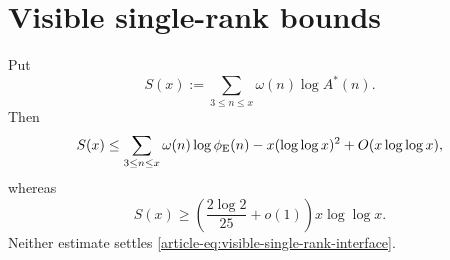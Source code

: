 \section{Visible single-rank bounds}
\label{sec:supp-visible-rank-bounds}

\begin{corollary}
\label{cor:visible-rank-sum-bounds}
Put
\[
 S(x):=\sum_{3\leq n\leq x}\omega(n)\log A^*(n).
\]
Then
\begin{equation}\label{eq:visible-rank-sum-upper}
 S(x)\leq
 \sum_{3\leq n\leq x}\omega(n)\log\phi_{\rm E}(n)
 -x(\log\log x)^2+O(x\log\log x),
\end{equation}
whereas
\begin{equation}\label{eq:visible-rank-sum-lower}
 S(x)\geq
 \left(\frac{2\log2}{25}+o(1)\right)x\log\log x.
\end{equation}
Neither estimate settles \eqref{article-eq:visible-single-rank-interface}.
\end{corollary}

